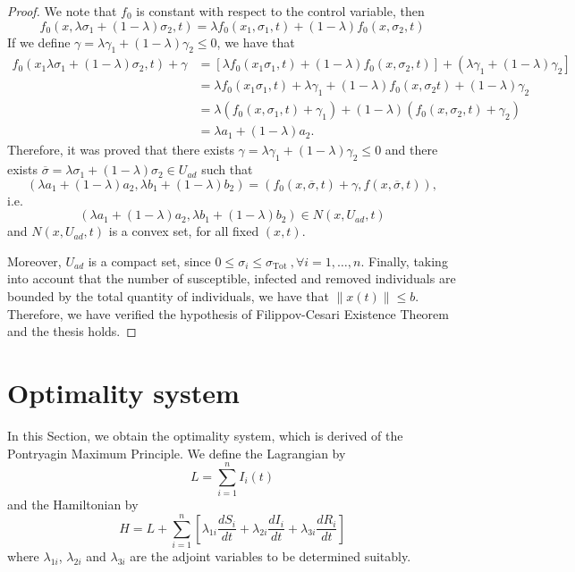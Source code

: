 \documentclass[a4paper,10pt]{article}
\theoremstyle{remark}
\begin{document}
\begin{proof}
We note that $f_0$ is constant with respect to the control variable, then
$$
f_{0}\left(x, \lambda \sigma_{1}+(1-\lambda) \sigma_{2}, t\right)=\lambda f_{0}\left(x_{1}, \sigma_{1}, t\right)+(1-\lambda) f_{0}\left(x, \sigma_{2}, t\right)
$$
If we define $\gamma=\lambda \gamma_{1}+(1-\lambda) \gamma_{2} \leqslant 0$, we have that
$$
\begin{aligned}
f_{0}\left(x_{1} \lambda \sigma_{1}+(1-\lambda) \sigma_{2}, t\right)+\gamma &=\left[\lambda f_{0}\left(x_{1} \sigma_{1}, t\right)+(1-\lambda) f_{0}\left(x, \sigma_{2}, t\right)\right]+\left(\lambda \gamma_{1}+(1-\lambda) \gamma_{2}\right] \\
&=\lambda f_{0}\left(x_{1} \sigma_{1}, t\right)+\lambda \gamma_{1}+(1-\lambda) f_{0}\left(x, \sigma_{2} t\right)+(1-\lambda) \gamma_{2} \\
&=\lambda\left(f_{0}\left(x, \sigma_{1}, t\right)+\gamma_{1}\right)+(1-\lambda)\left(f_{0}\left(x, \sigma_{2}, t\right)+\gamma_{2}\right) \\
&=\lambda a_{1}+(1-\lambda) a_{2}.
\end{aligned}
$$
Therefore, it was proved that there exists 
$\gamma=\lambda \gamma_{1}+(1-\lambda) \gamma_{2} \leqslant 0$ and there exists $\overline{\sigma}=\lambda \sigma_{1}+(1-\lambda) \sigma_{2} \in U_{ad}$
such that 
$$\left(\lambda {a_{1}}+(1-\lambda) {a_{2}}, \lambda b_{1}+(1-\lambda) b_{2}\right)=\left(f_{0}\left(x, \overline{\sigma}, t\right)+\gamma , f\left(x, \overline{\sigma}, t\right)\right),$$
i.e.
$$\left(\lambda a_{1}+(1-\lambda) a_{2}, \lambda b_{1}+(1-\lambda) b_{2}\right) \in N\left(x, U_{ad}, t\right)$$
and $N\left(x, U_{a d}, t\right)$ is a convex set, for all fixed $(x,t)$.

Moreover, $U_{ad}$ is a compact set, since $0 \leqslant \sigma_{i} \leqslant \sigma_{\text {Tot }}, \forall i=1, \ldots, n$. Finally, taking into account that the number of susceptible, infected and removed individuals are bounded by the total quantity of individuals, we have that $\|x(t)\| \leqslant b$. Therefore, we have verified the hypothesis of Filippov-Cesari Existence Theorem and the thesis holds.
\end{proof}

\section{Optimality system}

In this Section, we obtain the optimality system, which is derived of the Pontryagin Maximum Principle. We define the Lagrangian by
\[
L=\sum_{i=1}^{n} I_{i}(t)
\]
and the Hamiltonian by
\[
H=L+\sum_{i=1}^{n} \left[\lambda_{1i}\frac{d S_{i}}{dt}+\lambda_{2i}\frac{d I_{i}}{dt}+\lambda_{3i}\frac{d R_{i}}{dt}\right] 
\]
where $\lambda_{1i}$, $\lambda_{2i}$ and $\lambda_{3i}$ are the adjoint variables to be determined suitably.
\end{document}
